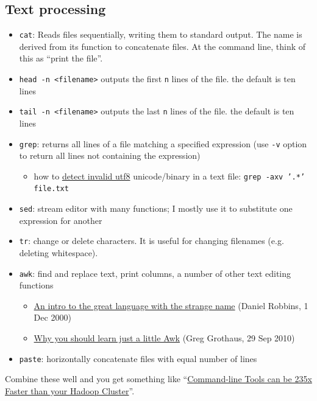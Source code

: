 \subsection{Text processing}

\begin{itemize}
	\item \texttt{cat}: Reads files sequentially, writing them to standard output. The name is derived from its function to concatenate files. At the command line, think of this as ``print the file''.
	\item \texttt{head -n <filename>} outputs the first \texttt{n} lines of the file. the default is ten lines
	\item \texttt{tail -n <filename>} outputs the last \texttt{n} lines of the file. the default is ten lines
	\item \texttt{grep}: returns all lines of a file matching a specified expression (use \texttt{-v} option to return all lines not containing the expression)
	\begin{itemize}
		\item how to \href{https://stackoverflow.com/questions/29465612/how-to-detect-invalid-utf8-unicode-binary-in-a-text-file}{detect invalid utf8} unicode/binary in a text file: \texttt{grep -axv '.*' file.txt}
	\end{itemize}
	\item \texttt{sed}: stream editor with many functions; I mostly use it to substitute one expression for another
	\item \texttt{tr}: change or delete characters. It is useful for changing filenames (e.g. deleting whitespace).
	\item \texttt{awk}: find and replace text, print columns, a number of other text editing functions
	\begin{itemize}
		\item \href{https://developer.ibm.com/tutorials/l-awk1/}{An intro to the great language with the strange name} (Daniel Robbins, 1 Dec 2000)
		\item \href{https://gregable.com/2010/09/why-you-should-know-just-little-awk.html}{Why you should learn just a little Awk} (Greg Grothaus, 29 Sep 2010)
	\end{itemize}
	\item \texttt{paste}: horizontally concatenate files with equal number of lines
\end{itemize}

Combine these well and you get something like
``\href{https://adamdrake.com/command-line-tools-can-be-235x-faster-than-your-hadoop-cluster.html}{Command-line Tools can be 235x Faster than your Hadoop Cluster}''.

